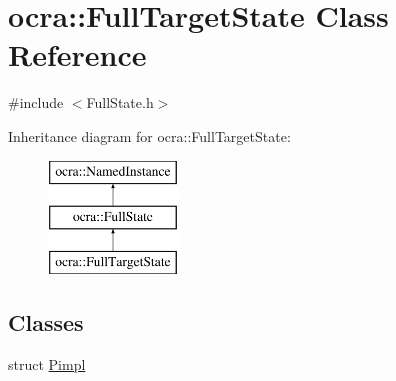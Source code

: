 \hypertarget{classocra_1_1FullTargetState}{}\section{ocra\+:\+:Full\+Target\+State Class Reference}
\label{classocra_1_1FullTargetState}


{\ttfamily \#include $<$Full\+State.\+h$>$}

Inheritance diagram for ocra\+:\+:Full\+Target\+State\+:\begin{figure}[H]
\begin{center}
\leavevmode
\includegraphics[height=3.000000cm]{d5/de2/classocra_1_1FullTargetState}
\end{center}
\end{figure}
\subsection*{Classes}
\begin{DoxyCompactItemize}
\item 
struct \hyperlink{structocra_1_1FullTargetState_1_1Pimpl}{Pimpl}
\end{DoxyCompactItemize}
